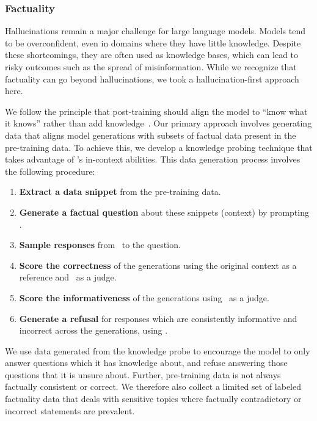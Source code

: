 \subsubsection{Factuality}\label{subsubsec:factuality}

Hallucinations remain a major challenge for large language models. Models tend to be overconfident, even in domains where they have little knowledge. Despite these shortcomings, they are often used as knowledge bases, which can lead to risky outcomes such as the spread of misinformation. While we recognize that factuality can go beyond hallucinations, we took a hallucination-first approach here.


We follow the principle that post-training should align the model to ``know what it knows'' rather than add knowledge~\citep{gekhman2024does,mielke2020metacognition}. Our primary approach involves generating data that aligns model generations with subsets of factual data present in the pre-training data. To achieve this, we develop a knowledge probing technique that takes advantage of \llamathree's in-context abilities. This data generation process involves the following procedure:

\begin{enumerate}
    \item \textbf{Extract a data snippet} from the pre-training data. %
    \item \textbf{Generate a factual question} about these snippets (context) by prompting \llamathree.
    \item \textbf{Sample responses} from \llamathree~to the question.
    \item \textbf{Score the correctness} of the generations using the original context as a reference and \llamathree~as a judge.
    \item \textbf{Score the informativeness} of the generations using \llamathree~as a judge.
    \item \textbf{Generate a refusal} for responses which are consistently informative and incorrect across the generations, using \llamathree.
\end{enumerate}

We use data generated from the knowledge probe to encourage the model to only answer questions which it has knowledge about, and refuse answering those questions that it is unsure about. %
Further, pre-training data is not always factually consistent or correct. We therefore also collect a limited set of labeled factuality data that deals with sensitive topics where factually contradictory or incorrect statements are prevalent. %

